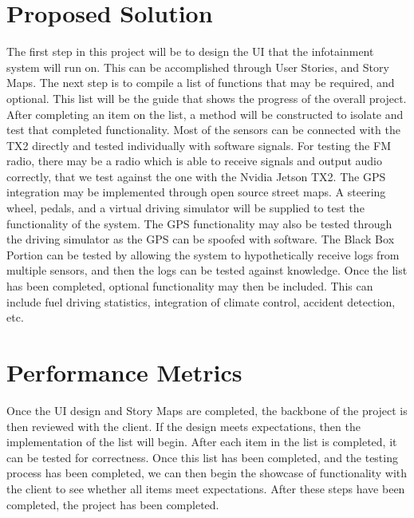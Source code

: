 \documentclass[onecolumn, draftclsnofoot,10pt, compsoc]{IEEEtran}
\begin{document}
\section{Proposed Solution}
The first step in this project will be to design the UI that the infotainment
system will run on. This can be accomplished through User Stories, and Story
Maps. The next step is to compile a list of functions that may be required,
and optional. This list will be the guide that shows the progress of the overall
project. After completing an item on the list, a method will be constructed
to isolate and test that completed functionality. Most of the sensors can be
connected with the TX2 directly and tested individually with software signals.
For testing the FM radio, there may be a radio which is able to receive signals
and output audio correctly, that we test against the one with the Nvidia Jetson
TX2. The GPS integration may be implemented through open source street
maps. A steering wheel, pedals, and a virtual driving simulator will be supplied
to test the functionality of the system. The GPS functionality may also be tested
through the driving simulator as the GPS can be spoofed with software. The
Black Box Portion can be tested by allowing the system to hypothetically receive
logs from multiple sensors, and then the logs can be tested against knowledge.
Once the list has been completed, optional functionality may then be included.
This can include fuel driving statistics, integration of climate control, accident
detection, etc.

\section{Performance Metrics}
Once the UI design and Story Maps are completed, the backbone of the project
is then reviewed with the client. If the design meets expectations, then the
implementation of the list will begin. After each item in the list is completed, it can be tested for correctness. Once this list has been completed, and the testing
process has been completed, we can then begin the showcase of functionality
with the client to see whether all items meet expectations. After these steps
have been completed, the project has been completed.
\end{document}
